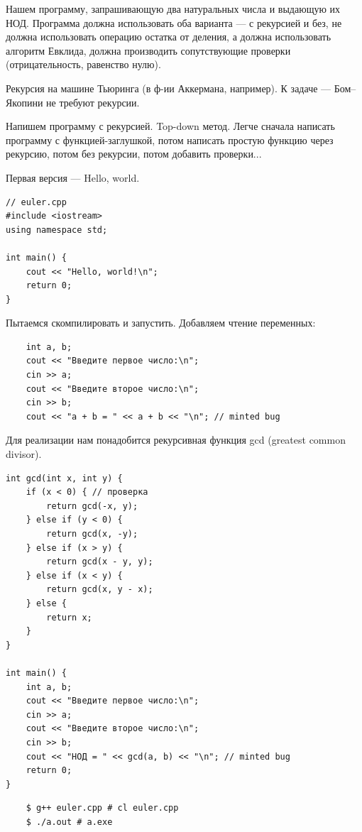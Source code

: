 \documentclass{book}
\begin{document}
Нашем программу, запрашивающую два натуральных числа и выдающую их НОД. Программа
должна использовать оба варианта --- с рекурсией и без, не должна
использовать операцию остатка от деления, а должна использовать алгоритм Евклида, должна
производить сопутствующие проверки (отрицательность, равенство нулю).

Рекурсия на машине Тьюринга (в ф-ии Аккермана, например). К задаче --- Бом--Якопини не требуют
рекурсии.

Напишем программу с рекурсией.
Top-down метод. Легче сначала написать программу с функцией-заглушкой, потом написать простую
функцию через рекурсию, потом без рекурсии, потом добавить проверки...

Первая версия --- Hello, world.
\begin{verbatim}
// euler.cpp
#include <iostream>
using namespace std;

int main() {
    cout << "Hello, world!\n";
    return 0;
}
\end{verbatim}

Пытаемся скомпилировать и запустить. Добавляем чтение переменных:
\begin{verbatim}
    int a, b;
    cout << "Введите первое число:\n";
    cin >> a;
    cout << "Введите второе число:\n";
    cin >> b;
    cout << "a + b = " << a + b << "\n"; // minted bug
\end{verbatim}

Для реализации нам понадобится рекурсивная функция gcd (greatest common divisor).
\begin{verbatim}
int gcd(int x, int y) {
    if (x < 0) { // проверка
        return gcd(-x, y);
    } else if (y < 0) {
        return gcd(x, -y);
    } else if (x > y) {
        return gcd(x - y, y);
    } else if (x < y) {
        return gcd(x, y - x);
    } else {
        return x;
    }
}

int main() {
    int a, b;
    cout << "Введите первое число:\n";
    cin >> a;
    cout << "Введите второе число:\n";
    cin >> b;
    cout << "НОД = " << gcd(a, b) << "\n"; // minted bug
    return 0;
}
\end{verbatim}

\begin{verbatim}
    $ g++ euler.cpp # cl euler.cpp
    $ ./a.out # a.exe
\end{verbatim}
\end{document}
